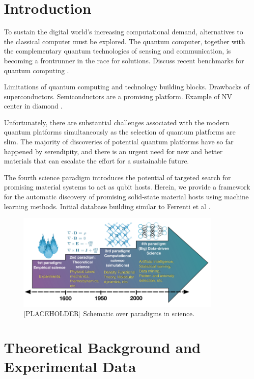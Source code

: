 \documentclass[superscriptaddress,unsortedaddress,
 amsmath,amssymb,
 aps,
]{revtex4-2}
\begin{document}
\section*{Introduction}%
To sustain the digital world’s increasing computational demand, alternatives to the classical computer must be explored. The quantum computer, together with the complementary quantum technologies of sensing and communication, is becoming a frontrunner in the race for solutions. 
Discuss recent benchmarks for quantum computing \cite{Arute_2019}. 

Limitations of quantum computing and technology building blocks. Drawbacks of superconductors. Semiconductors are a promising platform. Example of NV center in diamond \cite{Doherty_2013}. 

Unfortunately, there are substantial challenges associated with the modern quantum platforms simultaneously as the selection of quantum platforms are slim. The majority of discoveries of potential quantum platforms have so far happened by serendipity, and there is an urgent need for new and better materials that can escalate the effort for a sustainable future. 

The fourth science paradigm introduces the potential of targeted search for promising material systems to act as qubit hosts. 
Herein, we provide a framework for the automatic discovery of promising solid-state material hosts using machine learning methods. 
Initial database building similar to Ferrenti et al \cite{Ferrenti2020}. 

\begin{figure}[t]
    \centering
    \includegraphics[width=0.9\textwidth]{figures/paradigms.png}
    \caption{[PLACEHOLDER] Schematic over paradigms in science.}
    \label{fig:paradigm}
\end{figure}

\section*{Theoretical Background and Experimental Data} 
\end{document}
